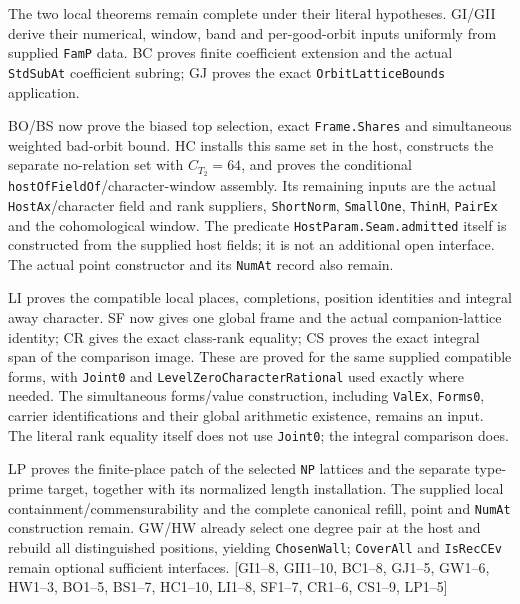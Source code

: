 \documentclass[11pt,a4paper]{article}
\numberwithin{equation}{section}
\theoremstyle{remark}\newtheorem{remark}[theorem]{Remark}
\begin{document}
\begin{description}[style=nextline]
\item[Construct one family realizing all the selected data.]
The two local theorems remain complete under their literal hypotheses.
GI/GII derive their numerical, window, band and per-good-orbit inputs
uniformly from supplied \texttt{FamP} data. BC proves finite coefficient
extension and the actual \texttt{StdSubAt} coefficient subring; GJ proves
the exact \texttt{OrbitLatticeBounds} application.

BO/BS now prove the biased top selection, exact \texttt{Frame.Shares}
and simultaneous weighted bad-orbit bound. HC installs this same set
in the host, constructs the separate no-relation set with $C_{T_2}=64$,
and proves the conditional \texttt{hostOfFieldOf}/character-window
assembly. Its remaining inputs are the actual \texttt{HostAx}/character
field and rank suppliers, \texttt{ShortNorm}, \texttt{SmallOne},
\texttt{ThinH}, \texttt{PairEx} and the cohomological window.
The predicate \texttt{HostParam.Seam.admitted} itself is constructed
from the supplied host fields; it is not an additional open interface.
The actual point constructor and its \texttt{NumAt} record also remain.

LI proves the compatible local places, completions, position identities
and integral away character. SF now gives one global frame and the actual
companion-lattice identity; CR gives the exact class-rank equality; CS
proves the exact integral span of the comparison image. These are proved
for the same supplied compatible forms, with \texttt{Joint0} and
\texttt{LevelZeroCharacterRational} used exactly where needed. The
simultaneous forms/value construction, including \texttt{ValEx},
\texttt{Forms0}, carrier identifications and their global arithmetic
existence, remains an input. The literal rank equality itself does not
use \texttt{Joint0}; the integral comparison does.

LP proves the finite-place patch of the selected \texttt{NP} lattices
and the separate type-prime target, together with its normalized length
installation. The supplied local containment/commensurability and the
complete canonical refill, point and \texttt{NumAt} construction remain.
GW/HW already select one degree pair at the host and rebuild all
distinguished positions, yielding \texttt{ChosenWall};
\texttt{CoverAll} and \texttt{IsRecCEv} remain optional sufficient
interfaces.
\textsf{[GI1--8, GII1--10, BC1--8, GJ1--5, GW1--6, HW1--3,
BO1--5, BS1--7, HC1--10, LI1--8, SF1--7, CR1--6, CS1--9, LP1--5]}


\end{description}
\end{document}
